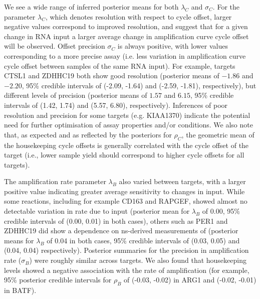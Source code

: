 \documentclass[../thesis.tex]{subfiles}
\begin{document}
We see a wide range of inferred posterior means for both $\lambda_C$ and $\sigma_C$. For the parameter $\lambda_C$, which denotes resolution with respect to cycle offset, larger negative values correspond to improved resolution, and suggest that for a given change in RNA input a larger average change in amplification curve cycle offset will be observed. Offset precision $\sigma_C$ is always positive, with lower values corresponding to a more precise assay (i.e. less variation in amplification curve cycle offset between samples of the same RNA input). For example, targets {CTSL1} and {ZDHHC19} both show good resolution (posterior means of $-1.86$ and $-2.20$, 95\% credible intervals of (-2.09, -1.64) and (-2.59, -1.81), respectively), but different levels of precision (posterior means of $1.57$ and $6.15$, 95\% credible intervals of (1.42, 1.74) and (5.57, 6.80), respectively). Inferences of poor resolution and precision for some targets (e.g. {KIAA1370}) indicate the potential need for further optimisation of assay properties and/or conditions. We also note that, as expected and as reflected by the posteriors for $\rho_C$, the geometric mean of the housekeeping cycle offsets is generally correlated with the cycle offset of the target (i.e., lower sample yield should correspond to higher cycle offsets for all targets). 

The amplification rate parameter $\lambda_B$ also varied between targets, with a larger positive value indicating greater average sensitivity to changes in  input. While some reactions, including for example {CD163} and {RAPGEF}, showed almost no detectable variation in rate due to  input (posterior mean for $\lambda_B$ of 0.00, 95\% credible intervals of (0.00, 0.01) in both cases), others such as {PER1} and {ZDHHC19} did show a dependence on \gls{ns}-derived measurements of  (posterior means for $\lambda_B$ of 0.04 in both cases, 95\% credible intervals of (0.03, 0.05) and (0.04, 0.04) respectively). Posterior summaries for the precision in amplification rate ($\sigma_{B}$) were roughly similar across targets. We also found that housekeeping levels showed a negative association with the rate of amplification (for example, 95\% posterior credible intervals for $\rho_B$ of (-0.03, -0.02) in ARG1 and (-0.02, -0.01) in BATF).
\end{document}
